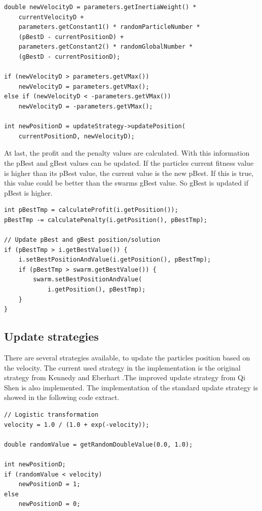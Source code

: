 \documentclass{article}
\begin{document}
\begin{lstlisting}[caption="Solver.cpp"]
double newVelocityD = parameters.getInertiaWeight() *
	currentVelocityD +
	parameters.getConstant1() * randomParticleNumber *
	(pBestD - currentPositionD) +
	parameters.getConstant2() * randomGlobalNumber *
	(gBestD - currentPositionD);

if (newVelocityD > parameters.getVMax())
    newVelocityD = parameters.getVMax();
else if (newVelocityD < -parameters.getVMax())
    newVelocityD = -parameters.getVMax();

int newPositionD = updateStrategy->updatePosition(
	currentPositionD, newVelocityD);
\end{lstlisting}

At last, the profit and the penalty values are calculated. With this information the pBest and gBest values can be updated. If the particles current fitness value is higher than its pBest value, the current value is the new pBest. If this is true, this value could be better than the swarms gBest value. So gBest is updated if pBest is higher.

\begin{lstlisting}[caption="Solver.cpp"]
int pBestTmp = calculateProfit(i.getPosition());
pBestTmp -= calculatePenalty(i.getPosition(), pBestTmp);

// Update pBest and gBest position/solution
if (pBestTmp > i.getBestValue()) {
	i.setBestPositionAndValue(i.getPosition(), pBestTmp);
	if (pBestTmp > swarm.getBestValue()) {
	    swarm.setBestPositionAndValue(
	    	i.getPosition(), pBestTmp);
	}
}
\end{lstlisting}

\subsection{Update strategies}
There are several strategies available, to update the particles position based on the velocity. The current used strategy in the implementation is the original strategy from Kennedy and Eberhart \cite{bib-discrete}.The improved update strategy from Qi Shen is also implemented. The implementation of the standard update strategy is showed in the following code extract.

\begin{lstlisting}[caption="UpdateStrategy.cpp"]
// Logistic transformation
velocity = 1.0 / (1.0 + exp(-velocity));

double randomValue = getRandomDoubleValue(0.0, 1.0);

int newPositionD;
if (randomValue < velocity)
    newPositionD = 1;
else
    newPositionD = 0;
\end{lstlisting}
\end{document}
